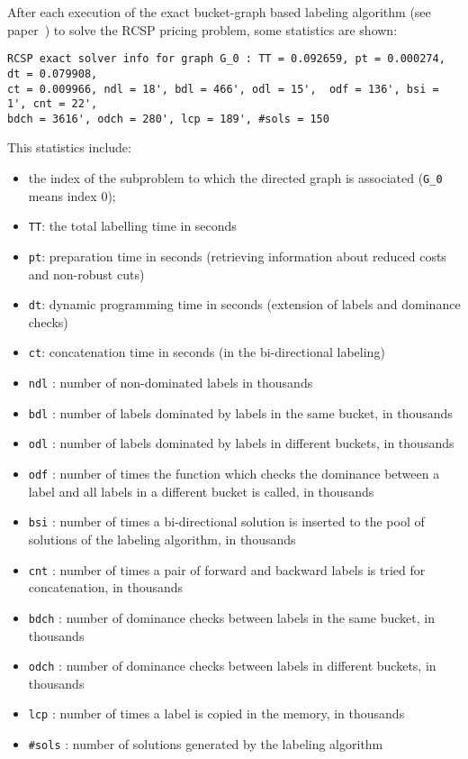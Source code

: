 \documentclass[10pt,a4paper]{article}
\begin{document}
\medskip
After each execution of the exact bucket-graph based labeling algorithm (see paper~\cite{SadykovUchoaPessoa:21l}) to
solve the RCSP pricing problem, some statistics are shown:
\scriptsize
\begin{verbatim}
RCSP exact solver info for graph G_0 : TT = 0.092659, pt = 0.000274, dt = 0.079908, 
ct = 0.009966, ndl = 18', bdl = 466', odl = 15',  odf = 136', bsi = 1', cnt = 22', 
bdch = 3616', odch = 280', lcp = 189', #sols = 150
\end{verbatim}
\normalsize
This statistics include:
\begin{itemize}
\item the index of the subproblem to which the directed graph is associated (\verb+G_0+ means index $0$);
\item \verb+TT+: the total labelling time in seconds
\item \verb+pt+: preparation time in seconds (retrieving information about reduced costs and non-robust cuts)
\item \verb+dt+: dynamic programming time in seconds (extension of labels and dominance checks)
\item \verb+ct+: concatenation time in seconds (in the bi-directional labeling)
\item \verb+ndl+ : number of non-dominated labels in thousands
\item \verb+bdl+ : number of labels dominated by labels in the same bucket, in thousands
\item \verb+odl+ : number of labels dominated by labels in different buckets, in thousands
\item \verb+odf+ : number of times the function which checks the dominance between a label and all labels in a different
  bucket is called, in thousands
\item \verb+bsi+ : number of times a bi-directional solution is inserted to the pool of solutions of the labeling
  algorithm, in thousands
\item \verb+cnt+ : number of times a pair of forward and backward labels is tried for concatenation, in thousands
\item \verb+bdch+ : number of dominance checks between labels in the same bucket, in thousands
\item \verb+odch+ : number of dominance checks between labels in different buckets, in thousands
\item \verb+lcp+ : number of times a label is copied in the memory, in thousands
\item \verb+#sols+ : number of solutions generated by the labeling algorithm
\end{itemize}
\end{document}

